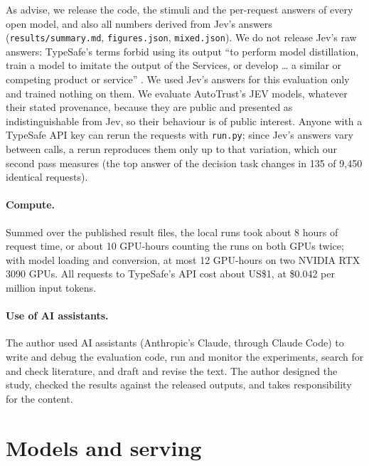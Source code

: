 \documentclass[11pt]{article}
\begin{document}
As \citet{biderman-etal-2024-lessons} advise, we release the code, the stimuli and the per-request answers of every open model, and also all numbers derived from Jev's answers (\texttt{results/summary.md}, \texttt{figures.json}, \texttt{mixed.json}). We do not release Jev's raw answers: TypeSafe's terms forbid using its output ``to perform model distillation, train a model to imitate the output of the Services, or develop \ldots{} a similar or competing product or service'' \citep[Section 2.3(b)]{typesafe-2026-mca}. We used Jev's answers for this evaluation only and trained nothing on them. We evaluate AutoTrust's JEV models, whatever their stated provenance, because they are public and presented as indistinguishable from Jev, so their behaviour is of public interest. Anyone with a TypeSafe API key can rerun the requests with \texttt{run.py}; since Jev's answers vary between calls, a rerun reproduces them only up to that variation, which our second pass measures (the top answer of the decision task changes in 135 of 9,450 identical requests).

\paragraph{Compute.} Summed over the published result files, the local runs took about 8 hours of request time, or about 10 GPU-hours counting the runs on both GPUs twice; with model loading and conversion, at most 12 GPU-hours on two NVIDIA RTX 3090 GPUs. All requests to TypeSafe's API cost about US\$1, at \$0.042 per million input tokens.

\paragraph{Use of AI assistants.} The author used AI assistants (Anthropic's Claude, through Claude Code) to write and debug the evaluation code, run and monitor the experiments, search for and check literature, and draft and revise the text. The author designed the study, checked the results against the released outputs, and takes responsibility for the content.



\appendix

\section{Models and serving}
\label{app:serving}
\end{document}

